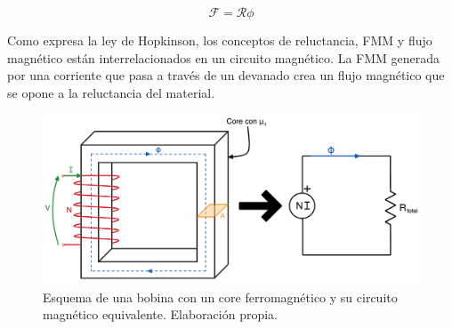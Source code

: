 \begin{itemize}
    \[\mathcal{F}=\mathcal{R}\phi\]
    
    Como expresa la ley de Hopkinson, los conceptos de reluctancia, FMM y flujo magnético están interrelacionados en un circuito magnético. La FMM generada por una corriente que pasa a través de un devanado crea un flujo magnético que se opone a la reluctancia del material.\citep{griffiths2005}\citep{tipler2008}

    \begin{figure}[H]
        \centering %
        \includegraphics[width=\textwidth]{FigurasMemoria/circuitoMagExplicacion.png}
        \caption{Esquema de una bobina con un core ferromagnético y su circuito magnético equivalente. Elaboración propia.}
        \label{fig:esquemabasico} %
    \end{figure}
\end{itemize}


